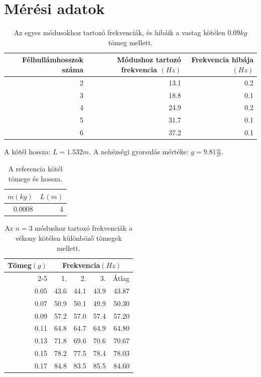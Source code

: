 \documentclass[10pt,pdftex]{report}
\begin{document}
\section*{Mérési adatok}
\begin{table}[H]
    \centering
    \begin{tabular}{|r|r|r|}
        \hline
        Félhullámhosszok száma & Módushoz tartozó frekvencia $(Hz)$ & Frekvencia hibája$(Hz)$ \\
        \hline
        2 & 13.1 & 0.2 \\
        \hline
        3 & 18.8 & 0.1 \\
        \hline
        4 & 24.9 & 0.2 \\
        \hline
        5 & 31.7 & 0.1 \\
        \hline
        6 & 37.2 & 0.1 \\
        \hline
    \end{tabular}
    \caption{Az egyes módusokhoz tartozó frekvenciák, és hibáik a vastag kötélen $0.09kg$ tömeg mellett.}
\end{table}
A kötél hossza: $L=1.532m$.
A nehézségi gyorsulás mértéke: $g=9.81\frac{m}{s^2}$.
\begin{table}[H]
    \centering
    \begin{tabular}{|r|r|}
        \hline
        $m(kg)$ & $L(m)$ \\
        \hline
        0.0008 & 4 \\ 
        \hline
    \end{tabular}
    \caption{A referencia kötél tömege és hossza.}
\end{table}
\begin{table}[H]
    \centering
    \begin{tabular}{|r|r|r|r|r|}
        \hline
        \multirow[c]{2}{*}{Tömeg$(g)$} & \multicolumn{4}{|c|}{Frekvencia$(Hz)$} \\
        \cline{2-5}
        & 1. & 2. & 3. & Átlag \\
        \hline
        0.05 & 43.6 & 44.1 & 43.9 & 43.87 \\
        \hline
        0.07 & 50.9 & 50.1 & 49.9 & 50.30 \\
        \hline
        0.09 & 57.2 & 57.0 & 57.4 & 57.20 \\
        \hline
        0.11 & 64.8 & 64.7 & 64.9 & 64.80 \\
        \hline
        0.13 & 71.8 & 69.6 & 70.6 & 70.67 \\
        \hline
        0.15 & 78.2 & 77.5 & 78.4 & 78.03 \\
        \hline
        0.17 & 84.8 & 83.5 & 85.5 & 84.60 \\
        \hline
    \end{tabular}
    \caption{Az $n=3$ módushoz tartozó frekvenciák a vékony kötélen különböző tömegek mellett.}
\end{table}
\end{document}
